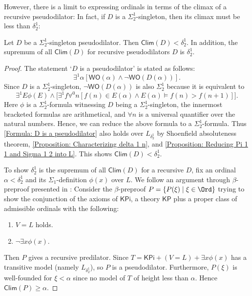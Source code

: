 \documentclass{mhkr}
\newcommand{\added}[1]{#1}
\newcommand{\WO}{\mathsf{WO}}
\newcommand{\Clim}{\mathsf{Clim}}
\newcommand{\KP}{\mathsf{KP}}
\begin{document}
However, there is a limit to expressing ordinals in terms of the climax of a recursive pseudodilator:
In fact, if $D$ is a $\Sigma^1_2$-\added{singleton}, then its climax must be less than $\delta^1_2$:
\begin{proposition}
    Let $D$ be a $\Sigma^1_2$-\added{singleton} pseudodilator. Then $\Clim(D)<\delta^1_2$. In addition, the supremum of all $\Clim(D)$ for recursive pseudodilators $D$ is $\delta^1_2$.
\end{proposition}
\begin{proof}
    The statement `$D$ is a pseudodilator' is stated as follows:
    \begin{equation} \label{Formula: D is a pseudodilator}
        \exists^1 \alpha [\WO(\alpha)\land \lnot\WO(D(\alpha))].
    \end{equation}
    Since $D$ is a $\Sigma^1_2$-\added{singleton}, $\lnot\WO(D(\alpha))$ is also $\Sigma^1_2$ because it is equivalent to
    \begin{equation*}
        \exists^1 E \phi(E) \land \bigl[\exists^1 f \forall^0 n [f(n)\in E(\alpha) \land E(\alpha)\vDash f(n) > f(n+1)]\bigr].
    \end{equation*}
    Here \added{$\phi$ is a $\Sigma^1_2$-formula witnessing $D$ being a $\Sigma^1_2$-singleton}, the innermost bracketed formulas are arithmetical, and $\forall n$ is a universal quantifier over the natural numbers. Hence, we can reduce the above formula to a $\Sigma^1_2$-formula.
    Thus \eqref{Formula: D is a pseudodilator} also holds over $L_{\delta^1_2}$ by Shoenfield absoluteness theorem, \autoref{Proposition: Characterizing delta 1 n}, and \autoref{Proposition: Reducing Pi 1 1 and Sigma 1 2 into L}. This shows $\Clim(D)<\delta^1_2$. 
    
    To show $\delta^1_2$ is the supremum of all $\Clim(D)$ for a recursive $D$, fix an ordinal $\alpha<\delta^1_2$ and its $\Sigma_1$-definition $\phi(x)$ over $L$. We follow an argument through $\beta$-preproof presented in \cite[Theorem 28]{AguileraPakhomov2023Pi12}: Consider the $\beta$-preproof $P=\{P(\xi)\mid\xi\in\Ord\}$ trying to show the conjunction of the axioms of $\mathsf{KPi}$, a theory $\KP$ plus a proper class of admissible ordinals with the following:
    \begin{enumerate}
        \item $V=L$ holds.
        \item $\lnot\exists x \phi(x)$.
    \end{enumerate}
    Then $P$ gives a recursive predilator.
    Since $T = \mathsf{KPi} + (V=L) + \exists x \phi(x)$ has a transitive model (namely $L_{\delta^1_2}$), so $P$ is a pseudodilator.
    Furthermore, $P(\xi)$ is well-founded for $\xi<\alpha$ since no model of $T$ of height less than $\alpha$. Hence $\Clim(P)\ge \alpha$.
\end{proof}
\end{document}

